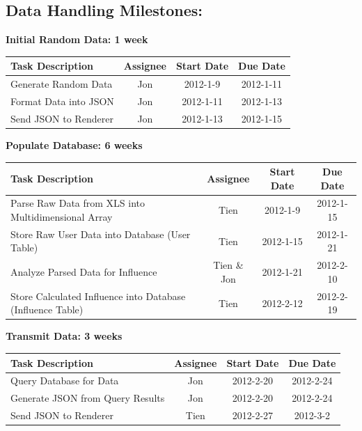 \documentclass[12pt, letterpaper]{article}
\begin{document}
  	\subsection{Data Handling Milestones:}

  \begin{center}
		{\bf Initial Random Data: 1 week}
    \begin{tabular}{| p{8.3cm} || c | c | c | }
      \hline
      Task Description & Assignee & Start Date & Due Date \\
      \hline
	    Generate Random Data & Jon & 2012-1-9 & 2012-1-11 \\
	    Format Data into JSON & Jon & 2012-1-11 & 2012-1-13 \\
	    Send JSON to Renderer & Jon & 2012-1-13 & 2012-1-15 \\
      \hline
    \end{tabular}
  \end{center}

  \begin{center}
		{\bf Populate Database: 6 weeks}
    \begin{tabular}{| p{8.3cm} || c | c | c | }
      \hline
      Task Description & Assignee & Start Date & Due Date \\
      \hline
	    Parse Raw Data from XLS into Multidimensional Array & Tien & 2012-1-9 & 2012-1-15 \\
        Store Raw User Data into Database (User Table) & Tien & 2012-1-15 & 2012-1-21 \\
	    Analyze Parsed Data for Influence & Tien \& Jon & 2012-1-21 & 2012-2-10 \\
        Store Calculated Influence into Database (Influence Table) & Tien & 2012-2-12 & 2012-2-19 \\
      \hline
    \end{tabular}
  \end{center}

  \begin{center}
		{\bf Transmit Data: 3 weeks}
    \begin{tabular}{| p{8.3cm} || c | c | c | }
      \hline
      Task Description & Assignee & Start Date & Due Date \\
      \hline
	    Query Database for Data & Jon & 2012-2-20 & 2012-2-24 \\
	    Generate JSON from Query Results & Jon & 2012-2-20 & 2012-2-24 \\
	    Send JSON to Renderer & Tien & 2012-2-27 & 2012-3-2 \\
      \hline
    \end{tabular}
  \end{center}
  
\end{document}
